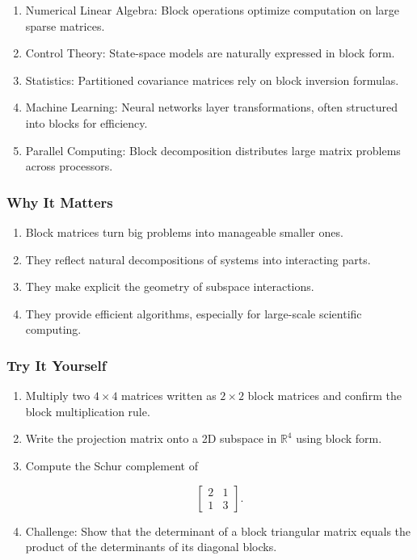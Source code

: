 \documentclass[
  letterpaper,
  DIV=11,
  numbers=noendperiod]{scrreprt}
\providecommand{\tightlist}{%
  \setlength{\itemsep}{0pt}\setlength{\parskip}{0pt}}
\begin{document}
\begin{enumerate}
\def\labelenumi{\arabic{enumi}.}
\tightlist
\item
  Numerical Linear Algebra: Block operations optimize computation on
  large sparse matrices.
\item
  Control Theory: State-space models are naturally expressed in block
  form.
\item
  Statistics: Partitioned covariance matrices rely on block inversion
  formulas.
\item
  Machine Learning: Neural networks layer transformations, often
  structured into blocks for efficiency.
\item
  Parallel Computing: Block decomposition distributes large matrix
  problems across processors.
\end{enumerate}

\subsubsection{Why It Matters}\label{why-it-matters-46}

\begin{enumerate}
\def\labelenumi{\arabic{enumi}.}
\tightlist
\item
  Block matrices turn big problems into manageable smaller ones.
\item
  They reflect natural decompositions of systems into interacting parts.
\item
  They make explicit the geometry of subspace interactions.
\item
  They provide efficient algorithms, especially for large-scale
  scientific computing.
\end{enumerate}

\subsubsection{Try It Yourself}\label{try-it-yourself-49}

\begin{enumerate}
\def\labelenumi{\arabic{enumi}.}
\item
  Multiply two \(4 \times 4\) matrices written as \(2 \times 2\) block
  matrices and confirm the block multiplication rule.
\item
  Write the projection matrix onto a 2D subspace in \(\mathbb{R}^4\)
  using block form.
\item
  Compute the Schur complement of

  \[
  \begin{bmatrix} 2 & 1 \\ 1 & 3 \end{bmatrix}.
  \]
\item
  Challenge: Show that the determinant of a block triangular matrix
  equals the product of the determinants of its diagonal blocks.
\end{enumerate}
\end{document}
